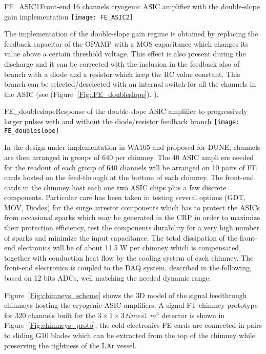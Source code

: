 \begin{cdrfigure}{FE_ASIC1}{Front-end 16 channels cryogenic ASIC amplifier with the double-slope gain implementation}
\texttt{[image: FE\_ASIC2]}
\end{cdrfigure}


The implementation of the double-slope gain regime is obtained by replacing the feedback capacitor of the OPAMP with a MOS capacitance which changes its value above a certain threshold voltage. This effect is also present during the discharge and it can be corrected with the inclusion in the feedback also of branch with a diode and a resistor which keep the RC value constant. This branch  can be selected/deselected with an internal switch for all the channels in the ASIC (see  (Figure~\ref{Fig:.FE_doubleslope}). ).


\begin{cdrfigure}{FE_doubleslope}{Response of the double-slope ASIC amplifier to progressively larger pulses with and without the diode/resistor feedback branch}
\texttt{[image: FE\_doubleslope]}
\end{cdrfigure}

In the design under implementation in WA105 and proposed for DUNE, channels are then arranged in groups of 640 per chimney. The 40 ASIC ampliers needed for the readout of each group of 640 channels will be arranged on 10 pairs of FE cards hosted on the feed-through at the bottom of each chimney. 
The front-end cards in the chimney host each one two ASIC chips plus a few discrete components. Particular care has been taken in testing several options (GDT, MOV, Diodes) for the surge arrestor components which has to protect the ASICs from occasional sparks which may be generated in the CRP in order to maximize their protection efficiency, test the components durability for a very high number of sparks and minimize the input capacitance.
The total dissipation of the front-end electronics will be of about 11.5 W per chimney which is compensated, together with conduction heat flow by the cooling system of each chimney.  The front-end electronics is coupled to the DAQ system, described in the following, based on 12 bits ADCs, well matching
the needed dynamic range.

Figure~\ref{Fig:chimneys_scheme} shows the 3D model of the signal feedthrough chimneys hosting the cryogenic ASIC amplifiers. A signal FT chimney prototype for 320 channels built for the $3\times1\times3\ times 1$ $m^3$ detector is shown in Figure~\ref{Fig:chimneys_proto}, the cold electronics FE cards are connected in pairs to sliding G10 blades which can be extracted from the top of the chimney while preserving the tightness of the LAr vessel.  


